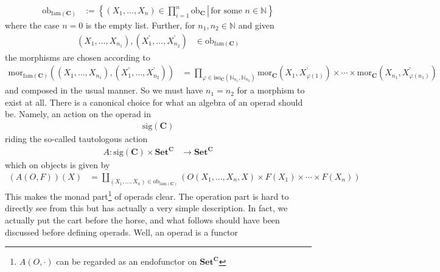 \begin{align*}
  \mathrm{ob}_{\mathrm{fam}(\mathbf{C})}
  &:=
  \left\lbrace
    \left.
      (X_{1},\ldots,X_{n})
      \in
      \prod_{i=1}^{n}
      \mathrm{ob}_{\mathbf{C}}
    \,
    \right\vert
    \,
      \text{for some }
      n
      \in
      \mathbb{N}
  \right\rbrace
\end{align*}
where the case $n=0$ is the empty list.
Further, for $n_{1},n_{2} \in \mathbb{N}$ and given
\begin{align*}
  (X_{1},\ldots,X_{n_{1}}),
  (X_{1}^{\backprime},\ldots,X_{n_{2}}^{\backprime})
  &\in
  \mathrm{ob}_{\mathrm{fam}(\mathbf{C})}
\end{align*}
the morphisms are chosen according to
\begin{align*}
  \mathrm{mor}_{\mathrm{fam}(\mathbf{C})}
  \left(
    (X_{1},\ldots,X_{n_{1}}),
    (X_{1}^{\backprime},\ldots,X_{n_{2}}^{\backprime})
  \right)
  &=
  \prod_{\varphi \in \mathrm{iso}_{\mathbf{C}}(\mathbb{N}_{n_{1}},\mathbb{N}_{n_{2}})}
  \mathrm{mor}_{\mathbf{C}}(X_{1},X_{\varphi(1)}^{\backprime})
  \times
  \cdots
  \times
  \mathrm{mor}_{\mathbf{C}}(X_{n_{1}},X_{\varphi(n_{1})}^{\backprime})
\end{align*}
and composed in the usual manner.
So we must have $n_{1} = n_{2}$ for a morphism to exist at all.
There is a canonical choice for what an algebra of an operad should be.
Namely, an action on the operad in 
\begin{align*}
  \mathrm{sig}(\mathbf{C})
\end{align*}
riding the so-called tautologous action
\begin{align*}
  A
  \colon
  \mathrm{sig}(\mathbf{C})
  \times
  \mathbf{Set}^{\mathbf{C}}
  &\rightarrow
  \mathbf{Set}^{\mathbf{C}}
\end{align*}
which on objects is given by
\begin{align*}
  \left(
    A(O,F)
  \right)
  (X)
  &=
  \coprod_{(X_{1},\ldots,X_{n}) \in \mathrm{ob}_{\mathrm{fam}(\mathbf{C})}}
  \left(
    O(X_{1},\ldots,X_{n},X)
    \times
    F(X_{1})
    \times
    \cdots
    \times
    F(X_{n})
  \right)
\end{align*}
This makes the monad part\footnote{$A(O,\cdot)$ can be regarded as an endofunctor on $\mathbf{Set}^{\mathbf{C}}$} of operads clear.
The operation part is hard to directly see from this but has actually a very simple description.
In fact, we actually put the cart before the horse, and what follows should have been discussed before defining operads.
Well, an operad is a functor
